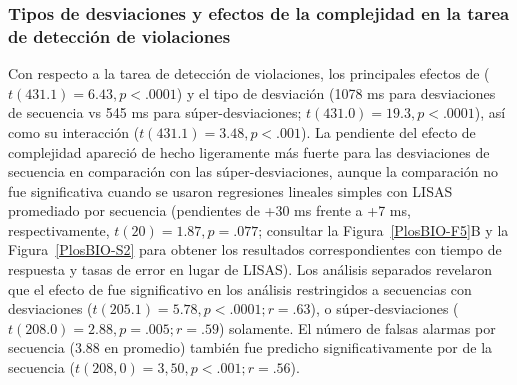 \subsubsection*{Tipos de desviaciones y efectos de la complejidad en la tarea de detección de violaciones}


Con respecto a la tarea de detección de violaciones, los principales efectos de \mdlbin ($t (431.1) = 6.43, p < .0001$) y el tipo de desviación (1078 ms para desviaciones de secuencia vs 545 ms para súper-desviaciones; $t (431.0) = 19.3, p < .0001$), así como su interacción ($t (431.1) = 3.48, p < .001$). La pendiente del efecto de complejidad apareció de hecho ligeramente más fuerte para las desviaciones de secuencia en comparación con las súper-desviaciones, aunque la comparación no fue significativa cuando se usaron regresiones lineales simples con LISAS promediado por secuencia (pendientes de +30 ms frente a +7 ms, respectivamente, $t (20) = 1.87, p = .077$; consultar la Figura~\ref{PlosBIO-F5}B y la Figura~\ref{PlosBIO-S2} para obtener los resultados correspondientes con tiempo de respuesta y tasas de error en lugar de LISAS). Los análisis separados revelaron que el efecto de \mdlbin fue significativo en los análisis restringidos a secuencias con desviaciones ($t (205.1) = 5.78, p < .0001; r = .63$), o súper-desviaciones ($t (208.0) = 2.88, p = .005; r = .59$) solamente. El número de falsas alarmas por secuencia (3.88 en promedio) también fue predicho significativamente por \mdlbin de la secuencia ($t (208,0) = 3,50, p < .001; r = .56$).

